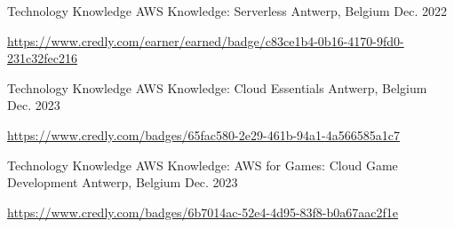 \begin{cventries}
\cventry
{Technology Knowledge} %
{AWS Knowledge: Serverless} %
{Antwerp, Belgium} %
{Dec. 2022} %
{
  \begin{cvitems} %
    \item \url{https://www.credly.com/earner/earned/badge/c83ce1b4-0b16-4170-9fd0-231c32fec216}
  \end{cvitems}
}

\cventry
{Technology Knowledge} %
{AWS Knowledge: Cloud Essentials} %
{Antwerp, Belgium} %
{Dec. 2023} %
{
  \begin{cvitems} %
    \item \url{https://www.credly.com/badges/65fac580-2e29-461b-94a1-4a566585a1c7}
  \end{cvitems}
}

\cventry
{Technology Knowledge} %
{AWS Knowledge: AWS for Games: Cloud Game Development} %
{Antwerp, Belgium} %
{Dec. 2023} %
{
  \begin{cvitems} %
    \item \url{https://www.credly.com/badges/6b7014ac-52e4-4d95-83f8-b0a67aac2f1e}
  \end{cvitems}
}

\end{cventries}
